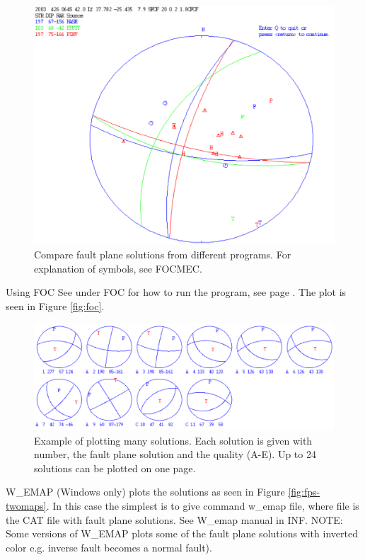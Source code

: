 \begin{figure}
\centerline{\includegraphics[width=0.9\linewidth]{fig/fps-compare}}
\caption{Compare fault plane solutions from different programs. For explanation of symbols, see FOCMEC.}
\label{fig:fps-compare}
\end{figure}


Using FOC\newline
See under FOC for how to run the program, see page
\pageref{page:foc}.
The plot is seen in Figure \ref{fig:foc}.


 
\begin{figure}
\centerline{\includegraphics[width=0.9\linewidth]{fig/fps-many}}
\caption{Example of plotting many solutions. Each solution is given with number, the fault plane solution and the quality (A-E). Up to 24 solutions can be plotted on one page.}
\label{fig:fps-many}
\end{figure}


W\_EMAP (Windows only) plots the solutions as seen in Figure \ref{fig:fps-twomaps}. 
In this case the simplest is to give command w\_emap file, where file 
is the CAT file with fault plane solutions. See W\_emap manual in INF. 
NOTE: Some versions of W\_EMAP plots some of the fault plane solutions 
with inverted color e.g. inverse fault becomes a normal fault).

